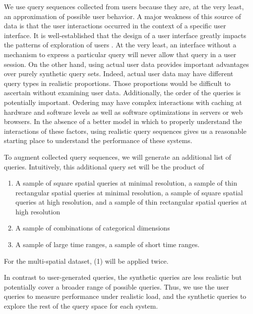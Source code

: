 \documentclass[journal]{vgtc}                %
\begin{document}
We use query sequences collected from users because they are, at the very least, an approximation of possible user behavior.  A major weakness of this source of data is that the user interactions occurred in the context of a specific user interface. It is well-established that the design of a user interface greatly impacts the patterns of exploration of users  \cite{?}. At the very least, an interface without a mechanism to express a particular query will never allow that query in a user session. On the other hand, using actual user data provides important advantages over purely synthetic query sets. Indeed, actual user data may have different query types in realistic proportions. Those proportions would be difficult to ascertain without examining user data. Additionally, the order of the queries is potentially important. Ordering may have complex interactions with caching at hardware and software levels as well as software optimizations in servers or web browsers. In the absence of a better model in which to properly understand the interactions of these factors, using realistic query sequences gives us a reasonable starting place to understand the performance of these systems.


To augment collected query sequences, we will generate an additional list of queries. Intuitively, this additional query set will be the product of 
\begin{enumerate}
	\item A sample of square spatial queries at minimal resolution, a sample of thin rectangular spatial queries at minimal resolution, a sample of square spatial queries at high resolution, and a sample of thin rectangular spatial queries at high resolution
	\item A sample of combinations of categorical dimensions
	\item A sample of large time ranges, a sample of short time ranges.
\end{enumerate}

For the multi-spatial dataset, (1) will be applied twice. 

In contrast to user-generated queries, the synthetic queries are less realistic but potentially cover a broader range of possible queries. Thus, we use the user queries to measure performance under realistic load, and the synthetic queries to explore the rest of the query space for each system.
\end{document}
